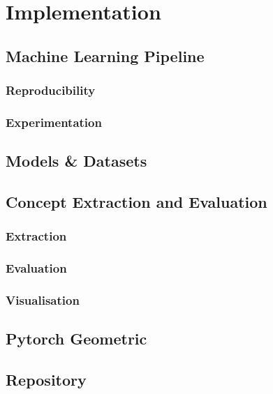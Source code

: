 \chapter{Implementation}

\section{Machine Learning Pipeline}

\subsection{Reproducibility}

\subsection{Experimentation}

\section{Models \& Datasets}

\section{Concept Extraction and Evaluation}

\subsection{Extraction}

\subsection{Evaluation}

\subsection{Visualisation}

\section{Pytorch Geometric}

\section{Repository}
